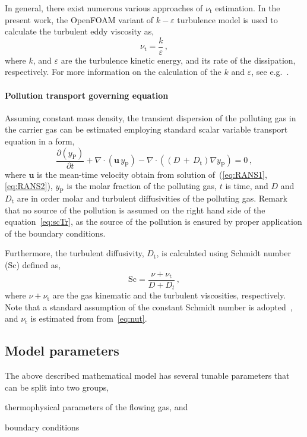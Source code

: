 In general, there exist numerous various approaches of $\nu_{\mathrm{t}}$ estimation. In the present work, the OpenFOAM variant of $k-\varepsilon$ turbulence model is used to calculate the turbulent eddy viscosity as,
\begin{equation}
    \label{eq:nut}
    \nu_{\mathrm{t}} = \frac{k}{\varepsilon}\,,
\end{equation}
where $k$, and $\varepsilon$ are the turbulence kinetic energy, and its rate of the dissipation, respectively. For more information on the calculation of the $k$ and $\varepsilon$, see e.g.~\cite{moukalled16,launder1974}.

\paragraph{Pollution transport governing equation} Assuming constant mass density, the transient dispersion of the polluting gas in the carrier gas can be estimated employing standard scalar variable transport equation in a form,
\begin{equation}
    \label{eq:scTr}
    \frac{\partial (y_{\mathrm{P}})}{\partial t} + \nabla\cdot(\bm{u}\, y_{\mathrm{P}}) - \nabla\cdot((D\,+\,D_{\mathrm{t}}) \nabla y_{\mathrm{P}}) = 0\,,
\end{equation}
where $\bm{u}$ is the mean-time velocity obtain from solution of~(\ref{eq:RANS1},\ref{eq:RANS2}), $y_{\mathrm{P}}$ is the molar fraction of the polluting gas, $t$ is time, and $D$ and $D_{\mathrm{t}}$ are in order molar and turbulent diffusivities of the polluting gas. Remark that no source of the pollution is assumed on the right hand side of the equation~\eqref{eq:scTr}, as the source of the pollution is ensured by proper application of the boundary conditions.

Furthermore, the turbulent diffusivity, $D_{\mathrm{t}}$, is calculated using Schmidt number (Sc) defined as, 
\begin{equation}
    \label{eq:Sc}
    \mathrm{Sc} = \frac{\nu + \nu_{\mathrm{t}}}{D + D_{t}}\,,
\end{equation}
where $\nu + \nu_{\mathrm{t}}$ are the gas kinematic and the turbulent viscosities, respectively. Note that a standard assumption of the constant Schmidt number is adopted~\cite{baik03}, and $\nu_{\mathrm{t}}$ is estimated from from~\eqref{eq:nut}.

\subsection{Model parameters}
\label{subsec:modPars}
The above described mathematical model has several tunable parameters that can be split into two groups,
\begin{inparaenum}[(i)]
    \item thermophysical parameters of the flowing gas, and
    \item boundary conditions
\end{inparaenum}

